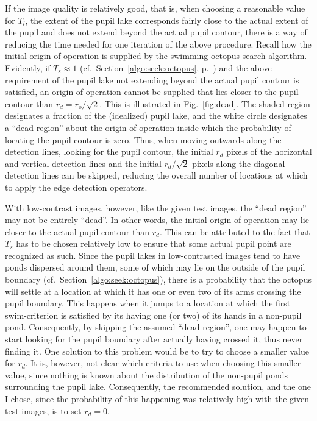 If the image quality is relatively good, that is, when choosing a
reasonable value for $T_{l}$, the extent of the pupil lake corresponds
fairly close to the actual extent of the pupil and does not extend
beyond the actual pupil contour, there is a way of reducing the time
needed for one iteration of the above procedure.  Recall how the
initial origin of operation is supplied by the swimming octopus search
algorithm.  Evidently, if $T_{s}\approx 1$ (cf.\ 
Section~\ref{algo:seek:octopus}, p.~\pageref{pg:Ts}) and the above
requirement of the pupil lake not extending beyond the actual pupil
contour is satisfied, an origin of operation cannot be supplied that
lies closer to the pupil contour than $r_{d}=r_{o}/\sqrt{2}$.  This is
illustrated in Fig.~\ref{fig:dead}.  The shaded region designates a
fraction of the (idealized) pupil lake, and the white circle
designates a ``dead region'' about the origin of operation inside
which the probability of locating the pupil contour is zero.  Thus,
when moving outwards along the detection lines, looking for the pupil
contour, the initial $r_{d}$ pixels of the horizontal and vertical
detection lines and the initial $r_{d}/\sqrt{2}$ pixels along the
diagonal detection lines can be skipped, reducing the overall number
of locations at which to apply the edge detection operators.

With low-contrast images, however, like the given test images, the
``dead region'' may not be entirely ``dead''.  In other words, the
initial origin of operation may lie closer to the actual pupil contour
than $r_{d}$.  This can be attributed to the fact that $T_{s}$ has to
be chosen relatively low to ensure that some actual pupil point are
recognized as such.  Since the pupil lakes in low-contrasted images
tend to have ponds dispersed around them, some of which may lie on the
outside of the pupil boundary (cf.\ Section~\ref{algo:seek:octopus}),
there is a probability that the octopus will settle at a location at
which it has one or even two of its arms crossing the pupil boundary.
This happens when it jumps to a location at which the first
swim-criterion is satisfied by its having one (or two) of its hands in
a non-pupil pond.  Consequently, by skipping the assumed ``dead
region'', one may happen to start looking for the pupil boundary after
actually having crossed it, thus never finding it.  One solution to
this problem would be to try to choose a smaller value for $r_{d}$.
It is, however, not clear which criteria to use when choosing this
smaller value, since nothing is known about the distribution of the
non-pupil ponds surrounding the pupil lake.  Consequently, the
recommended solution, and the one I chose, since the probability of
this happening was relatively high with the given test images, is to
set $r_{d}=0$.

